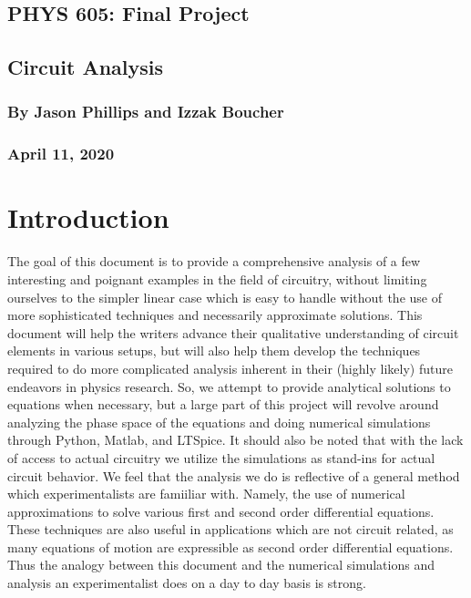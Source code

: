 \documentclass[12pt]{article}
\begin{document}
\begin{center}
\section*{PHYS 605: Final Project}
\subsection*{Circuit Analysis}
\subsubsection*{By Jason Phillips and Izzak Boucher}
\subsubsection*{April 11, 2020}
\end{center}

\tableofcontents
\pagebreak

\section{Introduction}

The goal of this document is to provide a comprehensive analysis of a few interesting and poignant examples in the field of circuitry, without limiting ourselves to the simpler linear case which is easy to handle without the use of more sophisticated techniques and necessarily approximate solutions.  This document will help the writers advance their qualitative understanding of circuit elements in various setups, but will also help them develop the techniques required to do more complicated analysis inherent in their (highly likely) future endeavors in physics research.  So, we attempt to provide analytical solutions to equations when necessary, but a large part of this project will revolve around analyzing the phase space of the equations and doing numerical simulations through Python, Matlab, and LTSpice.  It should also be noted that with the lack of access to actual circuitry we utilize the simulations as stand-ins for actual circuit behavior.  We feel that the analysis we do is reflective of a general method which experimentalists are famiiliar with.  Namely, the use of numerical approximations to solve various first and second order differential equations.  These techniques are also useful in applications which are not circuit related, as many equations of motion are expressible as second order differential equations.  Thus the analogy between this document and the numerical simulations and analysis an experimentalist does on a day to day basis is strong.
\end{document}
